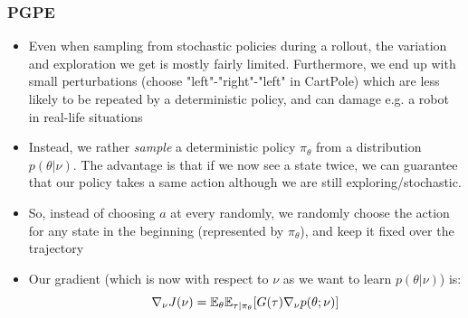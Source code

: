 \subsubsection{PGPE}
\begin{itemize}
	\item Even when sampling from stochastic policies during a rollout, the variation and exploration we get is mostly fairly limited. Furthermore, we end up with small perturbations (choose "left"-"right"-"left" in CartPole) which are less likely to be repeated by a deterministic policy, and can damage e.g. a robot in real-life situations
	\item Instead, we rather \textit{sample} a deterministic policy $\pi_{\theta}$ from a distribution $p(\theta|\nu)$.  The advantage is that if we now see a state twice, we can guarantee that our policy takes a same action although we are still exploring/stochastic. 
	\item So, instead of choosing $a$ at every randomly, we randomly choose the action for any state in the beginning (represented by $\pi_{\theta}$), and keep it fixed over the trajectory
	\item Our gradient (which is now with respect to $\nu$ as we want to learn $p(\theta|\nu)$) is:
	$$\nabla_{\nu} J(\nu) = \mathbb{E}_{\theta}\mathbb{E}_{\tau|\pi_{\theta}}[G(\tau) \nabla_{\nu}p(\theta;\nu)]$$
\end{itemize}
